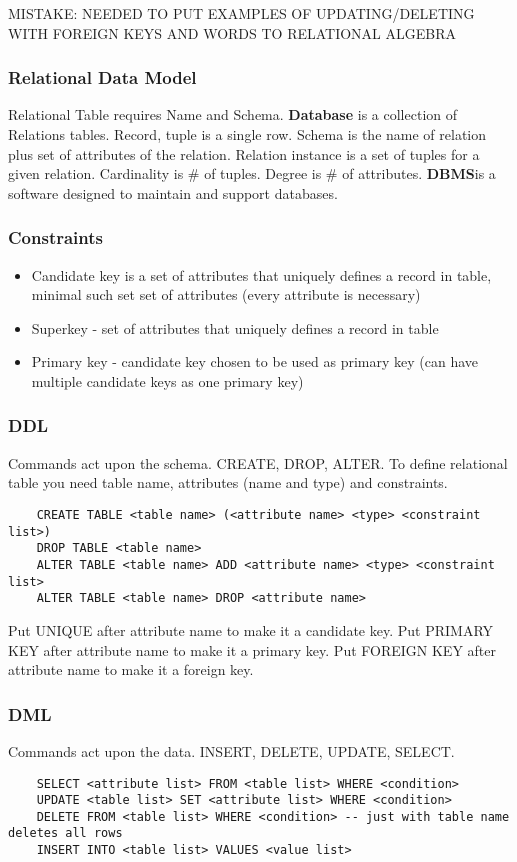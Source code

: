 \documentclass{article}
\begin{document}
MISTAKE: NEEDED TO PUT EXAMPLES OF UPDATING/DELETING WITH FOREIGN KEYS AND
WORDS TO RELATIONAL ALGEBRA

\subsubsection*{Relational Data Model}
Relational Table requires Name and Schema. \textbf{Database} is a collection of 
Relations tables. Record, tuple is a single row. Schema is the name of relation 
plus set of attributes of the relation. Relation instance is a set of tuples for
a given relation. Cardinality is \# of tuples. Degree is \# of attributes.
\textbf{DBMS}is a software designed to maintain and support databases.


\subsubsection*{Constraints}
\begin{itemize}
    \item Candidate key is a set of attributes that uniquely defines a record in
    table, minimal such set set of attributes (every attribute is necessary)
    \item Superkey - set of attributes that uniquely defines a record in table
    \item Primary key - candidate key chosen to be used as primary key (can have
    multiple candidate keys as one primary key)
\end{itemize}

\subsubsection*{DDL}
Commands act upon the schema. CREATE, DROP, ALTER. To define relational table
you need table name, attributes (name and type) and constraints.
\begin{verbatim}
    CREATE TABLE <table name> (<attribute name> <type> <constraint list>)
    DROP TABLE <table name>
    ALTER TABLE <table name> ADD <attribute name> <type> <constraint list>
    ALTER TABLE <table name> DROP <attribute name>
\end{verbatim}
Put UNIQUE after attribute name to make it a candidate key. Put PRIMARY KEY after
attribute name to make it a primary key. Put FOREIGN KEY after attribute name to
make it a foreign key.

\subsubsection*{DML}
Commands act upon the data. INSERT, DELETE, UPDATE, SELECT.
\begin{verbatim}
    SELECT <attribute list> FROM <table list> WHERE <condition>
    UPDATE <table list> SET <attribute list> WHERE <condition>
    DELETE FROM <table list> WHERE <condition> -- just with table name deletes all rows
    INSERT INTO <table list> VALUES <value list>
\end{verbatim}
\end{document}
